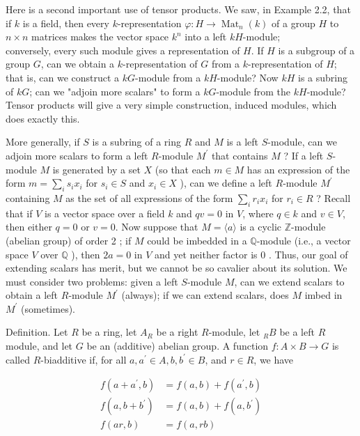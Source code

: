 \documentclass[10pt, letterpaper]{article}
\begin{document}
Here is a second important use of tensor products. We saw, in Example 2.2, that if $k$ is a field, then every $k$-representation $\varphi: H \rightarrow \operatorname{Mat}_{n}(k)$ of a group $H$ to $n \times n$ matrices makes the vector space $k^{n}$ into a left $k H$-module;\\
conversely, every such module gives a representation of $H$. If $H$ is a subgroup of a group $G$, can we obtain a $k$-representation of $G$ from a $k$-representation of $H$; that is, can we construct a $k G$-module from a $k H$-module? Now $k H$ is a subring of $k G$; can we "adjoin more scalars" to form a $k G$-module from the $k H$-module? Tensor products will give a very simple construction, induced modules, which does exactly this.

More generally, if $S$ is a subring of a ring $R$ and $M$ is a left $S$-module, can we adjoin more scalars to form a left $R$-module $M^{\prime}$ that contains $M$ ? If a left $S$-module $M$ is generated by a set $X$ (so that each $m \in M$ has an expression of the form $m=\sum_{i} s_{i} x_{i}$ for $s_{i} \in S$ and $x_{i} \in X$ ), can we define a left $R$-module $M^{\prime}$ containing $M$ as the set of all expressions of the form $\sum_{i} r_{i} x_{i}$ for $r_{i} \in R$ ? Recall that if $V$ is a vector space over a field $k$ and $q v=0$ in $V$, where $q \in k$ and $v \in V$, then either $q=0$ or $v=0$. Now suppose that $M=\langle a\rangle$ is a cyclic $\mathbb{Z}$-module (abelian group) of order 2 ; if $M$ could be imbedded in a $\mathbb{Q}$-module (i.e., a vector space $V$ over $\mathbb{Q}$ ), then $2 a=0$ in $V$ and yet neither factor is 0 . Thus, our goal of extending scalars has merit, but we cannot be so cavalier about its solution. We must consider two problems: given a left $S$-module $M$, can we extend scalars to obtain a left $R$-module $M^{\prime}$ (always); if we can extend scalars, does $M$ imbed in $M^{\prime}$ (sometimes).

Definition. Let $R$ be a ring, let $A_{R}$ be a right $R$-module, let ${ }_{R} B$ be a left $R$ module, and let $G$ be an (additive) abelian group. A function $f: A \times B \rightarrow G$ is called $R$-biadditive if, for all $a, a^{\prime} \in A, b, b^{\prime} \in B$, and $r \in R$, we have

$$
\begin{aligned}
f\left(a+a^{\prime}, b\right) & =f(a, b)+f\left(a^{\prime}, b\right) \\
f\left(a, b+b^{\prime}\right) & =f(a, b)+f\left(a, b^{\prime}\right) \\
f(a r, b) & =f(a, r b)
\end{aligned}
$$
\end{document}

